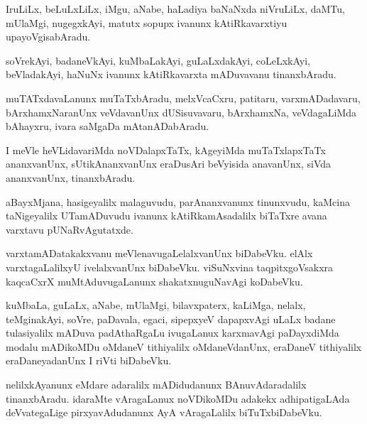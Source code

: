 \documentclass{article}
\begin{document}
\begin{mn}%
IruLiLx, beLuLxLiLx, iMgu, aNabe, haLadiya baNaNxda niVruLiLx, daMTu, mUlaMgi, nugegxkAyi, matutx 
sopupx ivanunx kAtiRkavarxtiyu upayoVgisabAradu.
\end{mn}

\begin{mn}%
soVrekAyi, badaneVkAyi, kuMbaLakAyi, guLaLxdakAyi, coLeLxkAyi, beVladakAyi, haNuNx ivanunx 
kAtiRkavarxta mADuvavanu tinanxbAradu.
\end{mn}

\begin{mn}%
muTATxdavaLanunx muTaTxbAradu, melxVcaCxru, patitaru, varxmADadavaru, bArxhamxNaranUnx veVdavanUnx 
dUSisuvavaru, bArxhamxNa, veVdagaLiMda bAhayxru, ivara saMgaDa mAtanADabAradu.
\end{mn}

\begin{mn}%
I meVle heVLidavariMda noVDalapxTaTx, kAgeyiMda muTaTxlapxTaTx ananxvanUnx, sUtikAnanxvanUnx 
eraDusAri beVyisida anavanUnx, siVda ananxvanUnx, tinanxbAradu.
\end{mn}

\begin{mn}%
aBayxMjana, hasigeyalilx malaguvudu, parAnanxvanunx tinunxvudu, kaMcina taNigeyalilx UTamADuvudu 
ivanunx kAtiRkamAsadalilx biTaTxre avana varxtavu pUNaRvAgutatxde.
\end{mn}

\begin{mn}%
varxtamADatakakxvanu meVlenavugaLelalxvanUnx biDabeVku. elAlx varxtagaLalilxyU ivelalxvanUnx 
biDabeVku. viSuNxvina taqpitxgoVsakxra kaqcaCxrX muMtAduvugaLanunx shakatxnuguNavAgi koDabeVku.
\end{mn}

\begin{mn}%
kuMbaLa, guLaLx, aNabe, mUlaMgi, bilavxpaterx, kaLiMga, nelalx, teMginakAyi, soVre, paDavala, 
egaci, sipepxyeV dapapxvAgi uLaLx badane tulasiyalilx mADuva padAthaRgaLu ivugaLanux karxmavAgi 
paDayxdiMda modalu mADikoMDu oMdaneV tithiyalilx oMdaneVdanUnx, eraDaneV tithiyalilx 
eraDaneyadanUnx I riVti biDabeVku.
\end{mn}

\begin{mn}%
nelilxkAyanunx eMdare adaralilx mADidudanunx BAnuvAdaradalilx tinanxbAradu. idaraMte vAragaLanux 
noVDikoMDu adakekx adhipatigaLAda deVvategaLige pirxyavAdudanunx AyA vAragaLalilx biTuTxbiDabeVku.
\end{mn}
\end{document}
